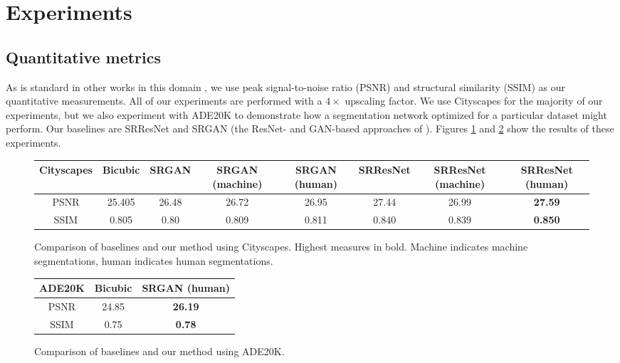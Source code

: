 \documentclass[10pt,twocolumn,letterpaper]{article}
\begin{document}

\section{Experiments}
\label{sec:results}

\subsection{Quantitative metrics}
As is standard in other works in this domain \cite{SRCNN, SRGAN,
PerceptualLosses, DeeplyRecursive}, we use peak signal-to-noise ratio (PSNR)
and structural similarity (SSIM) as our quantitative measurements. All of our
experiments are performed with a $4 \times$ upscaling factor. We use Cityscapes
for the majority of our experiments, but we also experiment with ADE20K to
demonstrate how a segmentation network optimized for a particular dataset might
perform. Our baselines are SRResNet and SRGAN (the ResNet- and GAN-based
approaches of \cite{SRGAN}). Figures \ref{fig:quantResultsCityscapes} and
\ref{fig:quantResultsADE} show the results of these experiments.

\begin{figure}[ht!]
    \begin{center}
        \small
        \begin{tabular}{c ccccccc}
            \textbf{Cityscapes} & Bicubic & SRGAN & SRGAN (machine) & SRGAN
            (human) & SRResNet & SRResNet (machine) & SRResNet (human) \\
            \hline
            PSNR & 25.405 & 26.48 & 26.72 & 26.95 & 27.44 & 26.99 &
            \textbf{27.59} \\
            SSIM & 0.805 & 0.80 & 0.809 & 0.811 & 0.840 & 0.839 &
            \textbf{0.850}
        \end{tabular}
    \end{center}
    \caption{Comparison of baselines and our method using Cityscapes. Highest
    measures in bold. Machine indicates machine segmentations, human indicates
    human segmentations.}
    \label{fig:quantResultsCityscapes}
\end{figure}

\begin{figure}[ht!]
    \begin{center}
        \small
        \begin{tabular}{c cc}
            \textbf{ADE20K} & Bicubic & SRGAN (human) \\
            \hline
            PSNR & 24.85 & \textbf{26.19} \\
            SSIM & 0.75 & \textbf{0.78}
        \end{tabular}
    \end{center}
    \caption{Comparison of baselines and our method using ADE20K.}
    \label{fig:quantResultsADE}
\end{figure}
\end{document}
